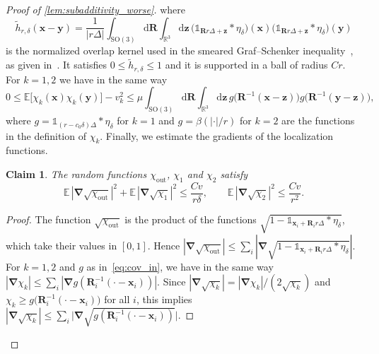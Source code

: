 \documentclass[final,reqno]{amsart}
\newtheorem*{claim}{Claim}
\theoremstyle{remark}
\renewcommand{\le}{\leqslant}
\renewcommand{\ge}{\geqslant}
\newcommand{\wt}[1]{\widetilde{#1}}
\newcommand{\RR}{\mathbb{R}}
\newcommand{\EE}{\mathbb{E}}
\newcommand{\SO}{\mathrm{SO}}
\newcommand{\iden}{\mathbb{1}}
\newcommand{\grad}{\bm{\nabla}}
\newcommand{\tetra}{\mathbb{\Delta}}
\newcommand{\dd}{\mathrm{d}}
\begin{document}
\begin{proof}[Proof of \cref{lem:subadditivity_worse}]
where
$$
\wt{h}_{r,\delta}(\mathbf{x}-\mathbf{y})=\frac1{|r\tetra|}\int_{\SO(3)}\dd\mathbf{R}\int_{\RR^3}\dd\mathbf{z}\,\big(\iden_{\mathbf{R}r\tetra+\mathbf{z}}\ast\eta_\delta\big)(\mathbf{x})\big(\iden_{\mathbf{R}r\tetra+\mathbf{z}}\ast\eta_\delta\big)(\mathbf{y})
$$
is the normalized overlap kernel used in the smeared Graf--Schenker inequality~\cite{graf1995molecular}, as given in~\cite[p.~55]{lewin2020local}. It satisfies $0\le\wt{h}_{r,\delta}\le1$ and it is supported in a ball of radius $Cr$. For $k=1,2$ we have in the same way
\begin{equation}\label{eq:cov_in}
0\le\EE\big[\chi_k(\mathbf{x})\chi_k(\mathbf{y})\big]-v_k^2\le \mu\int_{\SO(3)}\dd\mathbf{R}\int_{\RR^3}\dd\mathbf{z}\,g\big(\mathbf{R}^{-1}(\mathbf{x}-\mathbf{z})\big)g\big(\mathbf{R}^{-1}(\mathbf{y}-\mathbf{z})\big),
\end{equation}
where $g=\iden_{(r-c_0\delta)\tetra}\ast\eta_\delta$ for $k=1$ and $g=\beta(|\cdot|/r)$ for $k=2$ are the functions in the definition of $\chi_k$.
Finally, we estimate the gradients of the localization functions.

\begin{claim}
The random functions $\chi_{\mathrm{out}}$, $\chi_1$ and $\chi_2$ satisfy
\begin{equation}\label{eq:gradient_patterns}
\EE\,|\grad\sqrt{\chi_{\mathrm{out}}}|^2+\EE\,|\grad\sqrt{\chi_1}|^2\le\frac{Cv}{r\delta},\qquad \EE\,|\grad\sqrt{\chi_2}|^2\le\frac{Cv}{r^2}.
\end{equation}
\end{claim}

\begin{proof}
The function $\sqrt{\chi_{\mathrm{out}}}$ is the product of the functions $\sqrt{1-\iden_{\mathbf{x}_i+\mathbf{R}_ir\tetra}\ast\eta_\delta}$, which take their values in $[0,1]$. Hence $|\grad\sqrt{\chi_{\mathrm{out}}}|\le\sum_i|\grad\sqrt{1-\iden_{\mathbf{x}_i+\mathbf{R}_ir\tetra}\ast\eta_\delta}|$. For $k=1,2$ and $g$ as in~\cref{eq:cov_in}, we have in the same way $|\grad\chi_k|\le\sum_i|\grad g(\mathbf{R}_i^{-1}(\cdot-\mathbf{x}_i))|$. Since $|\grad\sqrt{\chi_k}|=|\grad\chi_k|/(2\sqrt{\chi_k})$ and $\chi_k\ge g\big(\mathbf{R}_i^{-1}(\cdot-\mathbf{x}_i)\big)$ for all $i$, this implies $|\grad\sqrt{\chi_k}|\le\sum_i\big|\grad\sqrt{g(\mathbf{R}_i^{-1}(\cdot-\mathbf{x}_i))}\big|$.


\end{proof}
\end{proof}
\end{document}
